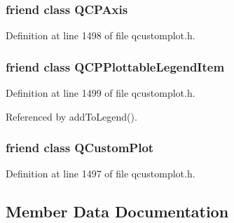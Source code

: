 \subsubsection[{Q\+C\+P\+Axis}]{\setlength{\rightskip}{0pt plus 5cm}friend class {\bf Q\+C\+P\+Axis}\hspace{0.3cm}{\ttfamily [friend]}}\label{class_q_c_p_abstract_plottable_af123edeca169ec7a31958a1d714e1a8a}


Definition at line 1498 of file qcustomplot.\+h.

\hypertarget{class_q_c_p_abstract_plottable_a104c78e91302afd6842a903e472f552f}{}
\subsubsection[{Q\+C\+P\+Plottable\+Legend\+Item}]{\setlength{\rightskip}{0pt plus 5cm}friend class {\bf Q\+C\+P\+Plottable\+Legend\+Item}\hspace{0.3cm}{\ttfamily [friend]}}\label{class_q_c_p_abstract_plottable_a104c78e91302afd6842a903e472f552f}


Definition at line 1499 of file qcustomplot.\+h.



Referenced by add\+To\+Legend().

\hypertarget{class_q_c_p_abstract_plottable_a1cdf9df76adcfae45261690aa0ca2198}{}
\subsubsection[{Q\+Custom\+Plot}]{\setlength{\rightskip}{0pt plus 5cm}friend class {\bf Q\+Custom\+Plot}\hspace{0.3cm}{\ttfamily [friend]}}\label{class_q_c_p_abstract_plottable_a1cdf9df76adcfae45261690aa0ca2198}


Definition at line 1497 of file qcustomplot.\+h.



\subsection{Member Data Documentation}
\hypertarget{class_q_c_p_abstract_plottable_ad48660b2bd301576e92fb033d8f455ea}{}
